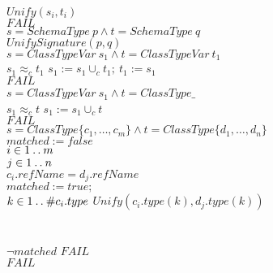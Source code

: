 \begin{algorithmic}[1]
$Unify(s_i, t_i)$ \TEND\\
\STATE \nexti\nexti\nexti\TELSE $FAIL$\\
\STATE \nexti\nexti\TELSE\TIF $s = SchemaType~p \land t = SchemaType~q$ \TTHEN\label{myline}\\
\STATE \nexti\nexti\nexti $UnifySignature(p, q)$\label{alg:unify-signature}\\
\STATE \nexti\nexti\TELSE\TIF $s=ClassTypeVar~s_1 \land t=ClassTypeVar~t_1$ \TTHEN
      \label{alg:start-var-class-types}\\
\STATE \nexti\nexti\nexti \TIF $s_1 \approx_{c} t_1$ \TTHEN%
 $s_1 := s_1 \cup_{c} t_1;~ t_1 := s_1$\\
\STATE \nexti\nexti\nexti \TELSE $FAIL$\\
\STATE \nexti\nexti\TELSE\TIF $s = ClassTypeVar~s_1 \land t =
ClassType\mathrel{\_}$~~\TTHEN\\
\STATE \nexti\nexti\nexti\TIF $s_1 \approx_{c} t$ \TTHEN $s_1 := s_1 \cup_{c} t$\\
\STATE \nexti\nexti\nexti\TELSE $FAIL$\label{alg:end-var-class-types}\\
\STATE \nexti\nexti\TELSE\TIF $s = ClassType \{c_1, \ldots, c_m\} \land t =
   ClassType\{d_1, \ldots, d_n\}$ \TTHEN\label{alg:state-ground-class-types}\\
\STATE \nexti\nexti{} $matched := false$\\
\STATE \nexti\nexti\nexti\TFOR $i \in 1 \mathbin{\mathstrut{\ldotp\ldotp}} m$ \TDO\\
\STATE \nexti\nexti\nexti\nexti\TFOR $j \in 1 \mathbin{\mathstrut{\ldotp\ldotp}} n$ \TDO\\
\STATE \nexti\nexti\nexti\nexti\nexti\TIF $c_i.refName = d_j.refName$ \TTHEN\\
\STATE \nexti\nexti\nexti\nexti\nexti\nexti$matched := true;$\\
\STATE \nexti\nexti\nexti\nexti\nexti\nexti\TFOR  $k \in 1 \mathbin{\mathstrut{\ldotp\ldotp}}
\#c_i.type$ \TDO $Unify(c_i.type(k), d_j.type(k))$ \TEND\\
\STATE \nexti\nexti\nexti\nexti\TEND\\
\STATE \nexti\nexti\nexti\TEND\\
\STATE \nexti\nexti\nexti\TIF $\lnot matched$ \TTHEN $FAIL$\label{alg:end-ground-class-types}\\
\STATE \nexti\nexti\TELSE $FAIL$\\
\STATE \nexti\TEND
\end{algorithmic}

